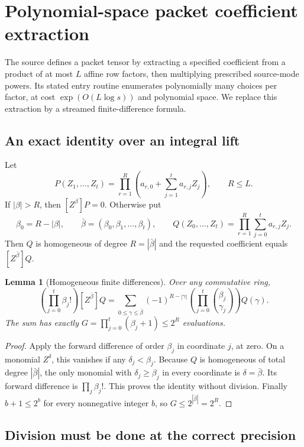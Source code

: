 \documentclass[11pt]{article}
\newtheorem{lemma}[theorem]{Lemma}
\theoremstyle{remark}
\begin{document}
\section{Polynomial-space packet coefficient extraction}
\label{sec:coefficient}

The source defines a packet tensor by extracting a specified coefficient from a product of at most $L$ affine row factors, then multiplying prescribed source-mode powers. Its stated entry routine enumerates polynomially many choices per factor, at cost $\exp(O(L\log s))$ and polynomial space. We replace this extraction by a streamed finite-difference formula.

\subsection{An exact identity over an integral lift}

Let
\[
 P(Z_1,\ldots,Z_t)=\prod_{r=1}^R
       \left(a_{r,0}+\sum_{j=1}^t a_{r,j}Z_j\right),
 \qquad R\le L.
\]
If $|\beta|>R$, then $[Z^\beta]P=0$. Otherwise put
\[
 \beta_0=R-|\beta|,\qquad
 \bar\beta=(\beta_0,\beta_1,\ldots,\beta_t),\qquad
 Q(Z_0,\ldots,Z_t)=\prod_{r=1}^R\sum_{j=0}^t a_{r,j}Z_j.
\]
Then $Q$ is homogeneous of degree $R=|\bar\beta|$ and the requested coefficient equals $[Z^{\bar\beta}]Q$.

\begin{lemma}[Homogeneous finite differences]
\label{lem:differences}
Over any commutative ring,
\begin{equation}
 \left(\prod_{j=0}^t\beta_j!\right)[Z^{\bar\beta}]Q
 =\sum_{0\le\gamma\le\bar\beta}
       (-1)^{R-|\gamma|}
       \left(\prod_{j=0}^t\binom{\beta_j}{\gamma_j}\right)Q(\gamma).
 \label{eq:differences}
\end{equation}
The sum has exactly $G=\prod_{j=0}^t(\beta_j+1)\le2^R$ evaluations.
\end{lemma}
\begin{proof}
Apply the forward difference of order $\beta_j$ in coordinate $j$, at zero. On a monomial $Z^\delta$, this vanishes if any $\delta_j<\beta_j$. Because $Q$ is homogeneous of total degree $|\bar\beta|$, the only monomial with $\delta_j\ge\beta_j$ in every coordinate is $\delta=\bar\beta$. Its forward difference is $\prod_j\beta_j!$. This proves the identity without division. Finally $b+1\le2^b$ for every nonnegative integer $b$, so $G\le2^{|\bar\beta|}=2^R$.
\end{proof}

\subsection{Division must be done at the correct precision}
\end{document}
